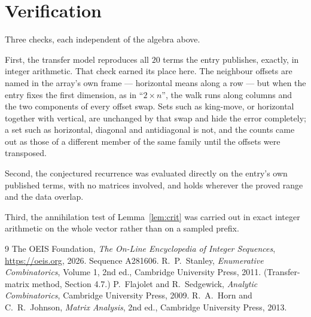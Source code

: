 \documentclass[11pt,a4paper]{article}
\theoremstyle{plain}
\theoremstyle{definition}
\begin{document}
\section{Verification}

Three checks, each independent of the algebra above.

First, the transfer model reproduces all $20$ terms the entry publishes, exactly, in
integer arithmetic. That check earned its place here. The neighbour offsets are named in the
array's own frame --- horizontal means along a row --- but when the entry fixes the first
dimension, as in ``$2\times n$'', the walk runs along columns and the two components of every
offset swap. Sets such as king-move, or horizontal together with vertical, are unchanged by
that swap and hide the error completely; a set such as horizontal, diagonal and antidiagonal
is not, and the counts came out as those of a different member of the same family until the
offsets were transposed.

Second, the conjectured recurrence was evaluated directly on the entry's own published terms,
with no matrices involved, and holds wherever the proved range and the data overlap.

Third, the annihilation test of Lemma~\ref{lem:crit} was carried out in exact integer
arithmetic on the whole vector rather than on a sampled prefix.

\begin{thebibliography}{9}
 The OEIS Foundation, \emph{The On-Line Encyclopedia of Integer
Sequences}, \url{https://oeis.org}, 2026. Sequence A281606.
 R.~P.~Stanley, \emph{Enumerative Combinatorics}, Volume 1, 2nd ed.,
Cambridge University Press, 2011. (Transfer-matrix method, Section 4.7.)
 P.~Flajolet and R.~Sedgewick, \emph{Analytic Combinatorics}, Cambridge
University Press, 2009.
 R.~A.~Horn and C.~R.~Johnson, \emph{Matrix Analysis}, 2nd ed., Cambridge
University Press, 2013.
\end{thebibliography}
\end{document}
